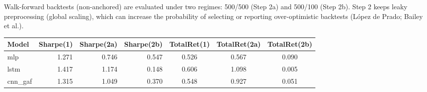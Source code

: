Walk-forward backtests (non-anchored) are evaluated under two regimes: 500/500 (Step 2a) and 500/100 (Step 2b). Step 2 keeps leaky preprocessing (global scaling), which can increase the probability of selecting or reporting over-optimistic backtests (L\'opez de Prado; Bailey et al.).
\begin{table}[H]
\centering
\small
\begin{tabular}{lrrrccc}
\toprule
Model & Sharpe(1) & Sharpe(2a) & Sharpe(2b) & TotalRet(1) & TotalRet(2a) & TotalRet(2b)\\
\midrule
mlp & 1.271 & 0.746 & 0.547 & 0.526 & 0.567 & 0.090 \\
lstm & 1.417 & 1.174 & 0.148 & 0.606 & 1.098 & 0.005 \\
cnn\_gaf & 1.315 & 1.049 & 0.370 & 0.548 & 0.927 & 0.051 \\
\bottomrule
\end{tabular}
\end{table}
